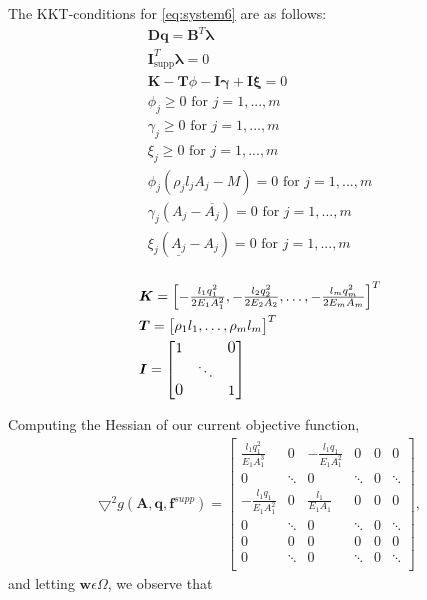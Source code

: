 

The KKT-conditions for \eqref{eq:system6} are as follows:
\begin{equation}
\label{KKT_system6}
\begin{aligned}
\bm{Dq} = \bm{B}^{T}\bm{\lambda}\\
\bm{I}^{T}_{\textrm{supp}}\bm{\lambda} = 0 \\
\bm{K} - \bm{T}\phi - \bm{I}\bm{\gamma} + \bm{I}\bm{\xi} = 0 \\
\phi_j \geq 0  \text{ for } j = 1,...,m \\
\gamma_j \geq 0 \text{ for } j = 1,...,m \\
\xi_j \geq 0 \text{ for } j = 1,...,m \\
\phi_j(\rho_{j}l_{j}A_{j}-M) = 0 \text{ for } j = 1,...,m \\
\gamma_{j}(A_{j}-\overline{A_{j}}) = 0 \text{ for } j = 1,...,m \\
\xi_{j}(\underline{A_{j}}-A_{j}) = 0 \text{ for } j = 1,...,m \\
\end{aligned}
\end{equation}

\begin{align*}
&\bm{K} = \begin{bmatrix}
       -\frac{l_{1}q_{1}^2}{2E_{1}A_{1}^2}
       , -\frac{l_{2}q_{2}^2}{2E_{2}A_{2}}, \hdots,-\frac{l_{m}q_{m}^2}{2E_{m}A_{m}}
     \end{bmatrix}^T \\
&\bm{T} = \begin{bmatrix}
       \rho_{1}l_{1}
       , \hdots,\rho_{m}l_{m}
     \end{bmatrix}^T \\
&\bm{I} = \begin{bmatrix}
1 &  &  \text{\large{0}}\\
  &  \ddots & \\
\text{\large{0}} &  & 1\\
\end{bmatrix}
\end{align*}

Computing the Hessian of our current objective function,
\begin{align*}
\bm{\bigtriangledown}^2 g(\bm{A},\bm{q},\bm{f}^{supp}) =
\left[\begin{array}{cc|cc|cc}
\frac{l_1q_1^2}{E_1A_1^3}&0& -\frac{l_1q_1}{E_1A_1^2} &0 & 0 & 0\\[0.3em]
0 &\ddots &0 & \ddots & 0 & \ddots\\[0.3em] \hline
-\frac{l_1q_1}{E_1A_1^2} & 0 & \frac{l_1}{E_1A_1} & 0 & 0 & 0\\[0.3em]
0 &\ddots & 0 &\ddots & 0 & \ddots\\[0.3em] \hline
0 & 0 & 0 & 0 & 0 & 0 \\[0.3em]
0 & \ddots & 0 & \ddots & 0 & \ddots\\[0.3em]
\end{array}\right],
\end{align*}
and letting $\bm{w}  \epsilon  \Omega$, we observe that


